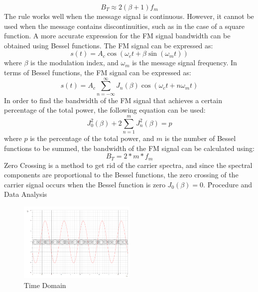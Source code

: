 \documentclass[12pt]{article}
\begin{document}
\begin{equation}
    B_T \approx 2(\beta + 1)f_m
\end{equation}
The rule works well when the message signal is continuous. However, it cannot be used when the message contains discontinuities, such as in the case of a square function. \cite{tutorialspoint_fm_modulators}
A more accurate expression for the FM signal bandwidth can be obtained using Bessel functions. The FM signal can be expressed as:
\begin{equation}
    s(t) = A_c \cos({\omega}_c t + \beta\sin({\omega}_m t))
\end{equation} 
where $\beta$ is the modulation index, and ${\omega}_m$ is the message signal frequency. In terms of Bessel functions, the FM signal can be expressed as:
\begin{equation}
    s(t) = A_c \sum_{n=-\infty}^{\infty} J_n(\beta) \cos({\omega}_c t + n{\omega}_m t)
\end{equation}
In order to find the bandwidth of the FM signal that achieves a certain percentage of the total power, the following equation can be used:
\begin{equation}
    J_0^{2}(\beta) + 2\sum_{n=1}^{m} J_n^{2}(\beta) = p
\end{equation}
where $p$ is the percentage of the total power, and $m$ is the number of Bessel functions to be summed, the bandwidth of the FM signal can be calculated using:
\begin{equation}
    B_T = 2*m*f_m
\end{equation}
Zero Crossing is a method to get rid of the carrier spectra,
and since the spectral components are proportional to the Bessel functions, the zero crossing of the carrier signal occurs when the Bessel function is zero $J_0(\beta) = 0$. 
\clearpage
\h{Procedure and Data Analysis}
\begin{figure}[H]
    \centering
    \includegraphics[width=0.5\textwidth]{assets/time_domain.png}
    \caption{Time Domain}
\end{figure}
\end{document}
